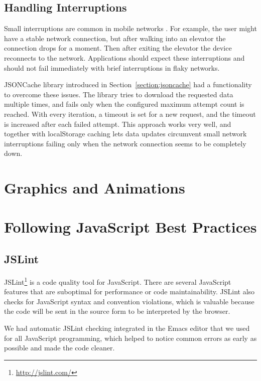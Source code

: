 \subsection{Handling Interruptions}

Small interruptions are common in mobile networks \citationneeded. For
example, the user might have a stable network connection, but after
walking into an elevator the connection drops for a moment. Then after
exiting the elevator the device reconnects to the
network. Applications should expect these interruptions and should not
fail immediately with brief interruptions in flaky networks.

JSONCache library introduced in Section~\ref{section:jsoncache} had a
functionality to overcome these issues. The library tries to download
the requested data multiple times, and fails only when the configured
maximum attempt count is reached. With every iteration, a timeout is
set for a new request, and the timeout is increased after each failed
attempt. This approach works very well, and together with localStorage
caching lets data updates circumvent small network interruptions
failing only when the network connection seems to be completely down.

\section{Graphics and Animations}
\label{section:graphics}



\section{Following JavaScript Best Practices}
\label{section:js-best-practices}

\subsection{JSLint}

JSLint\footnote{\url{http://jslint.com/}} is a code quality tool for
JavaScript. There are several JavaScript features that are suboptimal
for performance or code maintainability. JSLint also checks for
JavaScript syntax and convention violations, which is valuable because
the code will be sent in the source form to be interpreted by the
browser.

We had automatic JSLint checking integrated in the Emacs
\citationneeded editor that we used for all JavaScript programming,
which helped to notice common errors as early as possible and made the
code cleaner.

